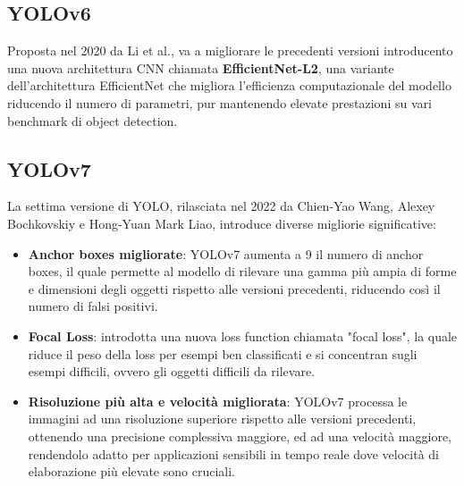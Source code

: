 \subsection{YOLOv6}
Proposta nel 2020 da Li et al.\cite{24}, va a migliorare le precedenti versioni introducento una nuova architettura CNN chiamata \textbf{EfficientNet-L2}, una variante dell'architettura EfficientNet che migliora l'efficienza computazionale del modello riducendo il numero di parametri, pur mantenendo elevate prestazioni su vari benchmark di object detection.

\newpage

\subsection{YOLOv7}
La settima versione di YOLO, rilasciata nel 2022 da Chien-Yao Wang, Alexey Bochkovskiy e Hong-Yuan Mark Liao\cite{25}, introduce diverse migliorie significative:
\begin{itemize}
  \item \textbf{Anchor boxes migliorate}: YOLOv7 aumenta a 9 il numero di anchor boxes, il quale permette al modello di rilevare una gamma più ampia di forme e dimensioni degli oggetti rispetto alle versioni precedenti, riducendo così il numero di falsi positivi.
  \item \textbf{Focal Loss}: introdotta una nuova loss function chiamata "focal loss", la quale riduce il peso della loss per esempi ben classificati e si concentran sugli esempi difficili, ovvero gli oggetti difficili da rilevare.
  \item \textbf{Risoluzione più alta e velocità migliorata}: YOLOv7 processa le immagini ad una risoluzione superiore rispetto alle versioni precedenti, ottenendo una precisione complessiva maggiore, ed ad una velocità maggiore, rendendolo adatto per applicazioni sensibili in tempo reale dove velocità di elaborazione più elevate sono cruciali.
\end{itemize}

\newpage